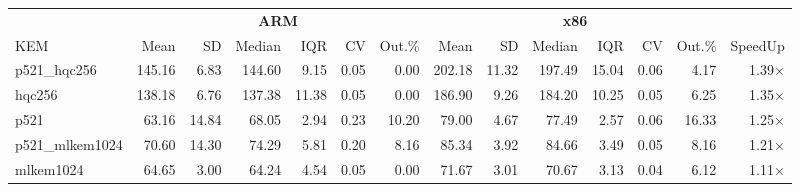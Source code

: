 \begin{table}[!ht]
\centering
\begin{tabular}{l|rrrrrr|rrrrrr|r}
\toprule
& \multicolumn{6}{c}{\bfseries ARM} & \multicolumn{6}{c}{\bfseries x86} & \\
\cmidrule(lr){2-7} \cmidrule(lr){8-13}
KEM & Mean & SD & Median & IQR & CV & Out.\% & Mean & SD & Median & IQR & CV & Out.\% & SpeedUp \\
\midrule
p521_hqc256 & 145.16 & 6.83 & 144.60 & 9.15 & 0.05 & 0.00 & 202.18 & 11.32 & 197.49 & 15.04 & 0.06 & 4.17 & 1.39× \\
hqc256 & 138.18 & 6.76 & 137.38 & 11.38 & 0.05 & 0.00 & 186.90 & 9.26 & 184.20 & 10.25 & 0.05 & 6.25 & 1.35× \\
p521 & 63.16 & 14.84 & 68.05 & 2.94 & 0.23 & 10.20 & 79.00 & 4.67 & 77.49 & 2.57 & 0.06 & 16.33 & 1.25× \\
p521_mlkem1024 & 70.60 & 14.30 & 74.29 & 5.81 & 0.20 & 8.16 & 85.34 & 3.92 & 84.66 & 3.49 & 0.05 & 8.16 & 1.21× \\
mlkem1024 & 64.65 & 3.00 & 64.24 & 4.54 & 0.05 & 0.00 & 71.67 & 3.01 & 70.67 & 3.13 & 0.04 & 6.12 & 1.11× \\
\bottomrule
\end{tabular}
\end{table}
